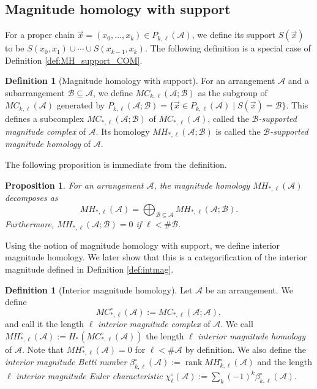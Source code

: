 \documentclass{amsart}
\numberwithin{equation}{section}
\newtheorem{prop}[thm]{Proposition}
\theoremstyle{plain}
\theoremstyle{remark}
\theoremstyle{definition}
\newtheorem{defn}[thm]{Definition}
\numberwithin{equation}{section}
\newcommand{\A}{\mathcal{A}}
\newcommand{\B}{\mathcal{B}}
\DeclareMathOperator{\rank}{rank}
\begin{document}
\subsection{Magnitude homology with support}

For a proper chain $\Vec{x}=(x_0,\ldots,x_k)\in P_{k,\ell}(\A)$, we define its support $S(\Vec{x})$ to be $S(x_0,x_1)\cup\cdots\cup S(x_{k-1},x_k)$.
The following definition is a special case of Definition \ref{def:MH_support_COM}.

\begin{defn}[Magnitude homology with support]\label{relativechain}
    For an arrangement $\A$ and a subarrangement $\B\subseteq\A$, we define $MC_{k,\ell}(\A;\B)$ as the subgroup of $MC_{k,\ell}(\A)$ generated by $P_{k,\ell}(\A;\B)=\{\Vec{x}\in P_{k,\ell}(\A)\mid S(\Vec{x})=\B\}$. This defines a subcomplex $MC_{*,\ell}(\A;\B)$ of $MC_{*,\ell}(\A)$, called the \emph{$\B$-supported magnitude complex} of $\A$. Its homology $MH_{*,\ell}(\A;\B)$ is called the \emph{$\B$-supported magnitude homology} of $\A$.
\end{defn}

The following proposition is immediate from the definition.

\begin{prop}\label{wallcrossing}
    For an arrangement $\A$, the magnitude homology $MH_{*,\ell}(\A)$ decomposes as
    \[
        MH_{*,\ell}(\A)=\bigoplus_{\B\subseteq \A} MH_{*,\ell}(\A;\B).
    \]
    Furthermore, $MH_{*,\ell}(\A;\B)=0$ if $\ell<\#\B$.
\end{prop}

Using the notion of magnitude homology with support, we define interior magnitude homology. We later show that this is a categorification of the interior magnitude defined in Definition \ref{def:intmag}.

\begin{defn}[Interior magnitude homology]\label{interiorMH}
    Let $\A$ be an arrangement.
    We define
    \[
    MC_{*,\ell}^{\circ}(\A):=MC_{*,\ell}(\A;\A),
    \]
    and call it the length $\ell$ \emph{interior magnitude complex} of $\A$.
    We call $MH_{*,\ell}^{\circ}(\A):=H_*(MC_{*,\ell}^{\circ}(\A))$ the length $\ell$ \emph{interior magnitude homology} of $\A$.
    Note that $MH^\circ_{*,\ell}(\A)=0$ for $\ell<\#\A$ by definition.
    We also define the \emph{interior magnitude Betti number} $\beta_{k,\ell}^{\circ}(\A):=\rank MH_{k,\ell}^{\circ}(\A)$ and the length $\ell$ \emph{interior magnitude Euler characteristic} $\chi_{\ell}^{\circ}(\A):=\sum_{k}(-1)^k\beta_{k,\ell}^{\circ}(\A)$.
\end{defn}
\end{document}
